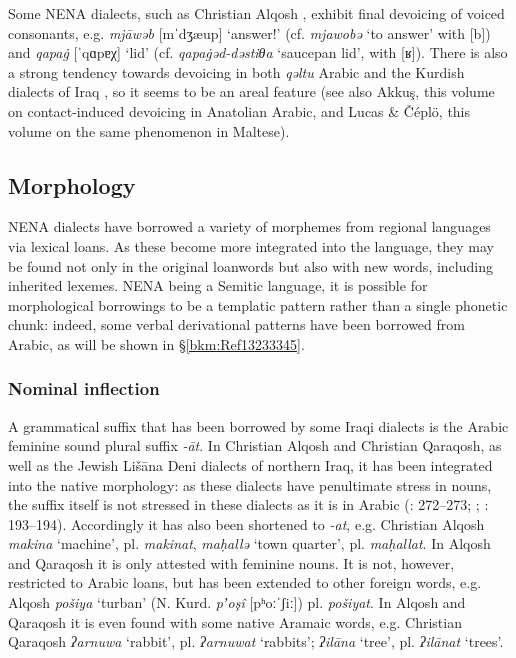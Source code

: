\documentclass[output=paper]{langsci/langscibook}
\begin{document}
Some NENA dialects, such as Christian Alqosh \citep[27]{Coghill2004}, exhibit final devoicing of voiced consonants, e.g. \textit{mjāwəb} [mˈdʒæup] ‘answer!’ (cf. \textit{mjawobə} ‘to answer’ with [b]) and \textit{qapa\.g} [ˈqɑpɐχ] ‘lid’ (cf. \textit{qapa\.gəd-dəstiθa} ‘saucepan lid’, with [ʁ]). There is also a strong tendency towards devoicing in both \textit{qəltu} Arabic \citep[98]{Jastrow1978} and the Kurdish dialects of Iraq \citep[49]{MacKenzie1961}, so it seems to be an areal feature (see also Akkuş, this volume on contact-induced devoicing in Anatolian Arabic, and Lucas \& Čéplö, this volume on the same phenomenon in Maltese).

\subsection{Morphology}

NENA dialects have borrowed a variety of morphemes from regional languages via lexical loans. As these become more integrated into the language, they may be found not only in the original loanwords but also with new words, including inherited lexemes. NENA being a Semitic language, it is possible for morphological borrowings to be a templatic pattern rather than a single phonetic chunk: indeed, some verbal derivational patterns have been borrowed from Arabic, as will be shown in §\ref{bkm:Ref13233345}.

\subsubsection{\label{bkm:Ref534226861}Nominal inflection}

A grammatical suffix that has been borrowed by some Iraqi dialects is the Arabic feminine sound plural suffix \textit{{}-āt}. In Christian Alqosh and Christian Qaraqosh, as well as the Jewish Lišāna Deni dialects of northern Iraq, it has been integrated into the native morphology: as these dialects have penultimate stress in nouns, the suffix itself is not stressed in these dialects as it is in Arabic (\citealt{Coghill2004}: 272–273; \citeyear{Coghill2005}; \citealt{Khan2002}: 193–194). Accordingly it has also been shortened to \textit{\nobreakdash-at}, e.g. Christian Alqosh \textit{makina} ‘machine’, pl. \textit{makinat}, \textit{maḥallə} ‘town quarter’, pl. \textit{maḥallat}. In Alqosh and Qaraqosh it is only attested with feminine nouns. It is not, however, restricted to Arabic loans, but has been extended to other foreign words, e.g. Alqosh \textit{pošiya} ‘turban’ (N. Kurd. \textit{pʼoşî} [pʰoːˈʃiː]) pl. \textit{pošiyat}. In Alqosh and Qaraqosh it is even found with some native Aramaic words, e.g. Christian Qaraqosh \textit{ʔarnuwa} ‘rabbit’, pl. \textit{ʔarnuwat} ‘rabbits’; \textit{ʔilāna} ‘tree’, pl. \textit{ʔilānat} ‘trees’.
\end{document}
